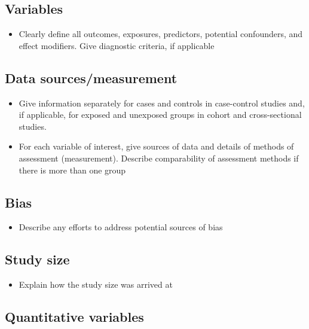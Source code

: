\documentclass[
  letterpaper,
  DIV=11,
  numbers=noendperiod,
  oneside,
  11pt]{scrartcl}
\providecommand{\tightlist}{%
  \setlength{\itemsep}{0pt}\setlength{\parskip}{0pt}}\usepackage{longtable,booktabs,array}
\begin{document}
\subsection{Variables}\label{variables}

\begin{itemize}
\tightlist
\item
  Clearly define all outcomes, exposures, predictors, potential
  confounders, and effect modifiers. Give diagnostic criteria, if
  applicable
\end{itemize}

\subsection{Data sources/measurement}\label{data-sourcesmeasurement}

\begin{itemize}
\tightlist
\item
  Give information separately for cases and controls in case-control
  studies and, if applicable, for exposed and unexposed groups in cohort
  and cross-sectional studies.
\item
  For each variable of interest, give sources of data and details of
  methods of assessment (measurement). Describe comparability of
  assessment methods if there is more than one group
\end{itemize}

\subsection{Bias}\label{bias}

\begin{itemize}
\tightlist
\item
  Describe any efforts to address potential sources of bias
\end{itemize}

\subsection{Study size}\label{study-size}

\begin{itemize}
\tightlist
\item
  Explain how the study size was arrived at
\end{itemize}

\subsection{Quantitative variables}\label{quantitative-variables}
\end{document}
